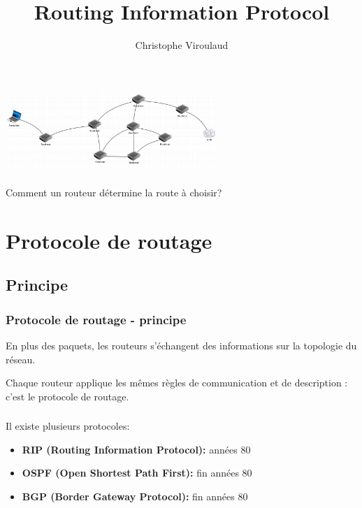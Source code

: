 \documentclass[svgnames,11pt]{beamer}
\author[]{Christophe Viroulaud}
\title{Routing Information Protocol}
\date{\framebox{\textbf{Archi 11}}}
\institute{Terminale - NSI}
\begin{document}
\begin{frame}
\titlepage
\end{frame}
\begin{frame}
    \frametitle{}

    \begin{center}
    \centering
    \includegraphics[width=8cm]{ressources/reseau-intro.png}
    \label{IMG}
    \end{center}

\end{frame}
\begin{frame}
    \frametitle{}

\begin{framed}
    \centering Comment un routeur détermine la route à choisir?
\end{framed}
\end{frame}
\section{Protocole de routage}
\subsection{Principe}
\begin{frame}
    \frametitle{Protocole de routage - principe}
    En plus des paquets, les routeurs s’échangent des informations sur la topologie du réseau.
    \begin{aretenir}[]
        Chaque routeur applique les mêmes règles de communication et de description : c’est le protocole de routage.
    \end{aretenir}

\end{frame}
\begin{frame}
    \frametitle{}

    Il existe plusieurs protocoles:
    \begin{itemize}
        \item \textbf{RIP (Routing Information Protocol): } années 80
        \item \textbf{OSPF (Open Shortest Path First): } fin années 80
        \item \textbf{BGP (Border Gateway Protocol): } fin années 80
    \end{itemize}

\end{frame}
\end{document}
